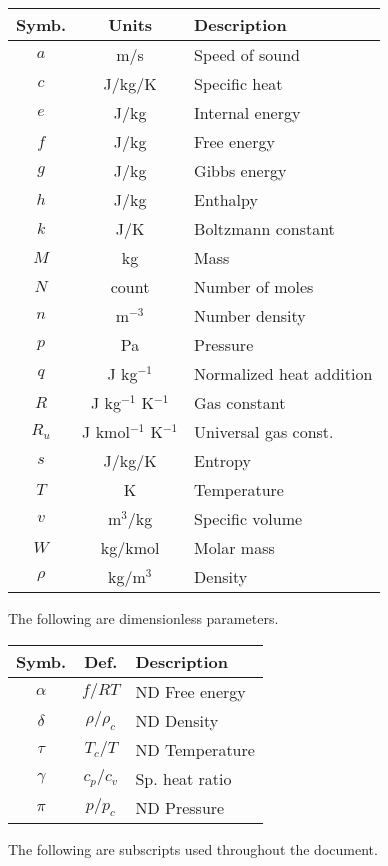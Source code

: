 \vspace{1em}
\begin{tabular}{|ccl|}
\hline
Symb. & Units & Description\\
\hline
$a$ & m/s & Speed of sound\\
$c$ & J/kg/K & Specific heat\\
$e$ & J/kg & Internal energy\\
$f$ & J/kg & Free energy\\
$g$ & J/kg & Gibbs energy\\
$h$ & J/kg & Enthalpy\\
$k$ & J/K & Boltzmann constant\\
$M$ & kg & Mass\\
$N$ & count & Number of moles\\
$n$ & m$^{-3}$ & Number density\\
$p$ & Pa & Pressure\\
$q$ & J kg$^{-1}$ & Normalized heat addition\\
$R$ & J kg$^{-1}$ K$^{-1}$ & Gas constant\\
$R_u$ & J kmol$^{-1}$ K$^{-1}$ & Universal gas const.\\
$s$ & J/kg/K & Entropy\\
$T$ & K & Temperature\\
$v$ & m$^3$/kg & Specific volume\\
$W$ & kg/kmol & Molar mass\\
$\rho$ & kg/m$^3$ & Density\\
\hline
\end{tabular}
\vspace{1em}

The following are dimensionless parameters.

\vspace{1em}
\begin{tabular}{|ccl|}
\hline
Symb. & Def. & Description\\
\hline
$\alpha$ & $f / RT$ & ND Free energy\\
$\delta$ & $\rho/\rho_c$ & ND Density\\
$\tau$ & $T_c / T$ & ND Temperature\\
$\gamma$ & $c_p / c_v$ & Sp. heat ratio\\
$\pi$ & $p / p_c$ & ND Pressure\\
\hline
\end{tabular}
\vspace{1em}

The following are subscripts used throughout the document.

